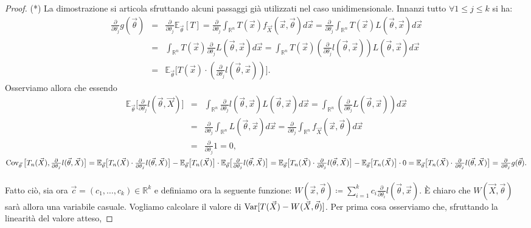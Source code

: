 \begin{proof} (*)
La dimostrazione si articola sfruttando alcuni passaggi già utilizzati nel caso unidimensionale. Innanzi tutto $\forall 1\leq j \leq k$ si ha:
\begin{eqnarray*}
\frac{\partial}{\partial\theta_j}g(\vec{\theta}) &=& \frac{\partial}{\partial\theta_j}\mathbb{E}_{\vec{\theta}}[T]=\frac{\partial}{\partial\theta_j}\int_{\mathbb{R}^n} T(\vec{x})f_{\vec{X}}(\vec{x},\vec{\theta})d\vec{x}=\frac{\partial}{\partial\theta_j}\int_{\mathbb{R}^n} T(\vec{x})L(\vec{\theta},\vec{x})d\vec{x} \\
&=& \int_{\mathbb{R}^n} T(\vec{x})\frac{\partial}{\partial\theta_j}L(\vec{\theta},\vec{x})d\vec{x}= \int_{\mathbb{R}^n} T(\vec{x})\left(\frac{\partial}{\partial\theta_j}l(\vec{\theta},\vec{x})\right)L(\vec{\theta},\vec{x}) d\vec{x} \\
&=& \mathbb{E}_{\vec{\theta}}\Big[T(\vec{x})\cdot\left(\frac{\partial}{\partial\theta_j}l(\vec{\theta},\vec{x})\right)\Big].
\end{eqnarray*}
Osserviamo allora che essendo 
\begin{eqnarray*}
\mathbb{E}_{\vec{\theta}} \Big[\frac{\partial}{\partial\theta_j}l(\vec{\theta},\vec{X})\Big] &= & \int_{\mathbb{R}^n}  \frac{\partial}{\partial\theta_j}l(\vec{\theta},\vec{x})L(\vec{\theta},\vec{x})d\vec{x}=\int_{\mathbb{R}^n} \left(\frac{\partial}{\partial\theta_j}L(\vec{\theta},\vec{x})\right)d\vec{x}\\
&=& \frac{\partial}{\partial\theta_j}\int_{\mathbb{R}^n}L(\vec{\theta},\vec{x})d\vec{x}=\frac{\partial}{\partial\theta_j}\int_{\mathbb{R}^n}f_{\vec{X}}(\vec{x},\vec{\theta})d\vec{x}\\ 
&=& \frac{\partial}{\partial\theta_j} 1=0,
\end{eqnarray*}
$\operatorname{Cov}_{\vec{\theta}} \big[T_n(\vec{X}),\frac{\partial}{\partial\theta_j}l(\vec{\theta},\vec{X})\big]=\mathbb{E}_{\vec{\theta}}\big[T_n(\vec{X})\cdot\frac{\partial}{\partial\theta_j}l(\vec{\theta},\vec{X})\big]-\mathbb{E}_{\vec{\theta}}\big[T_n(\vec{X})\big]\cdot \mathbb{E}_{\vec{\theta}}\big[\frac{\partial}{\partial\theta_j}l(\vec{\theta},\vec{X})\big]=\mathbb{E}_{\vec{\theta}}\big[T_n(\vec{X})\cdot\frac{\partial}{\partial\theta_j}l(\vec{\theta},\vec{X})\big]-\mathbb{E}_{\vec{\theta}}\big[T_n(\vec{X})\big]\cdot 0=\mathbb{E}_{\vec{\theta}}\big[T_n(\vec{X})\cdot\frac{\partial}{\partial\theta_j}l(\vec{\theta},\vec{X})\big]=\frac{\partial}{\partial\theta_j}g(\vec{\theta}).$
\\
\\
Fatto ciò, sia ora $\vec{c}=(c_1,\ldots,c_k)\in \mathbb{R}^k$ e definiamo ora la seguente funzione: $W(\vec{x}, \vec{\theta})\coloneqq \sum_{i=1}^k c_i \frac{\partial}{\partial \theta_i} l(\vec{\theta}, \vec{x})$. È chiaro che $W(\vec{X}, \vec{\theta})$ sarà allora una variabile casuale. Vogliamo calcolare il valore di $\operatorname{Var}[T(\vec{X})-W(\vec{X}, \vec{\theta})]$. Per prima cosa osserviamo che, sfruttando la linearità del valore atteso,

\end{proof}
